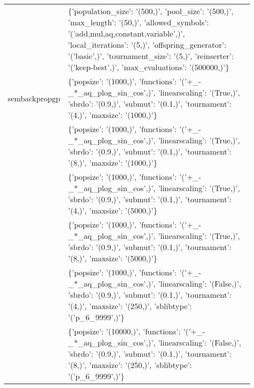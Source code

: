 \begin{tabular}{l p{37em}}
              &                  \{'population\_size': '(500,)', 'pool\_size': '(500,)', 'max\_length': '(50,)', 'allowed\_symbols': '('add,mul,aq,constant,variable',)', 'local\_iterations': '(5,)', 'offspring\_generator': '('basic',)', 'tournament\_size': '(5,)', 'reinserter': '('keep-best',)', 'max\_evaluations': '(500000,)'\} \\
sembackpropgp &                                                                                                                                 \{'popsize': '(1000,)', 'functions': '('+\_-\_*\_aq\_plog\_sin\_cos',)', 'linearscaling': '(True,)', 'sbrdo': '(0.9,)', 'submut': '(0.1,)', 'tournament': '(4,)', 'maxsize': '(1000,)'\} \\
              &                                                                                                                                 \{'popsize': '(1000,)', 'functions': '('+\_-\_*\_aq\_plog\_sin\_cos',)', 'linearscaling': '(True,)', 'sbrdo': '(0.9,)', 'submut': '(0.1,)', 'tournament': '(8,)', 'maxsize': '(1000,)'\} \\
              &                                                                                                                                 \{'popsize': '(1000,)', 'functions': '('+\_-\_*\_aq\_plog\_sin\_cos',)', 'linearscaling': '(True,)', 'sbrdo': '(0.9,)', 'submut': '(0.1,)', 'tournament': '(4,)', 'maxsize': '(5000,)'\} \\
              &                                                                                                                                 \{'popsize': '(1000,)', 'functions': '('+\_-\_*\_aq\_plog\_sin\_cos',)', 'linearscaling': '(True,)', 'sbrdo': '(0.9,)', 'submut': '(0.1,)', 'tournament': '(8,)', 'maxsize': '(5000,)'\} \\
              &                                                                                                   \{'popsize': '(1000,)', 'functions': '('+\_-\_*\_aq\_plog\_sin\_cos',)', 'linearscaling': '(False,)', 'sbrdo': '(0.9,)', 'submut': '(0.1,)', 'tournament': '(4,)', 'maxsize': '(250,)', 'sblibtype': '('p\_6\_9999',)'\} \\
              &                                                                                                  \{'popsize': '(10000,)', 'functions': '('+\_-\_*\_aq\_plog\_sin\_cos',)', 'linearscaling': '(False,)', 'sbrdo': '(0.9,)', 'submut': '(0.1,)', 'tournament': '(8,)', 'maxsize': '(250,)', 'sblibtype': '('p\_6\_9999',)'\} \\
\bottomrule
\end{tabular}
